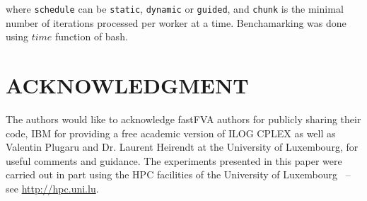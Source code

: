 \documentclass[letterpaper, 10 pt, conference]{ieeeconf}  %
\begin{document}
where \texttt{schedule} can be \texttt{static}, \texttt{dynamic} or \texttt{guided}, and \texttt{chunk} is the minimal number of iterations processed per worker at a time. 
Benchamarking was done using $time$ function of bash.
\addtolength{\textheight}{-12cm}   %








\section*{ACKNOWLEDGMENT}

The authors would like to acknowledge fastFVA authors for publicly sharing their code, IBM for providing a free academic version of ILOG CPLEX as well as Valentin Plugaru and Dr. Laurent Heirendt at the University of Luxembourg, for useful comments and guidance. The experiments presented in this paper were carried out
in part using the HPC facilities of the University of Luxembourg~\cite{VBCG_HPCS14} 
{\small -- see \url{http://hpc.uni.lu}}.




 

\end{document}
